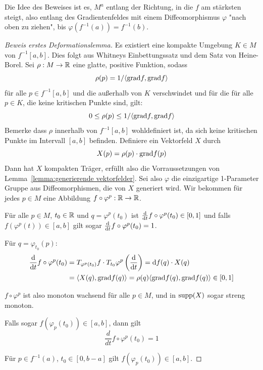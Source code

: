 Die Idee des Beweises ist es, $M^a$ entlang der Richtung, in die $f$ am stärksten
steigt, also entlang des Gradientenfeldes mit einem Diffeomorphismus $\varphi$ 
"nach oben zu ziehen", bis $\varphi(f^{-1}(a)) = f^{-1}(b)$.

\begin{proof}[Beweis erstes Deformationslemma]
    Es existiert eine kompakte Umgebung $K \in M$ von $f^{-1}[a, b]$. Dies folgt
    aus Whitneys Einbettungssatz und dem Satz von Heine-Borel.
    Sei $\rho: M \to { \mathbb R }$ eine glatte, positive Funktion, sodass
    \[ \rho(p) = 1 / \langle { \operatorname{grad} } f, { \operatorname{grad} } f \rangle \]
    für alle $p \in f^{-1}[a, b]$ und die außerhalb von $K$ verschwindet und für
    die für alle $p \in K$, die keine kritischen Punkte sind, gilt: 
    \[ 0 \leq \rho(p) \leq 1 / \langle { \operatorname{grad} } f, { \operatorname{grad} } f \rangle \]
    Bemerke dass $\rho$ innerhalb von $f^{-1}[a, b]$ wohldefiniert 
    ist, da sich keine kritischen Punkte im Intervall $[a, b]$ befinden. 
    Definiere ein Vektorfeld $X$ durch
    \[ X(p) = \rho(p) \cdot { \operatorname{grad} } f (p) \]
    Dann hat $X$ kompakten Träger, erfüllt also die Vorraussetzungen von 
    Lemma~\ref{lemma:generierende vektorfelder}. Sei also $\varphi$ die
    einzigartige 1-Parameter Gruppe aus Diffeomorphismen, die von $X$ generiert
    wird. 
    Wir bekommen für jedes $p \in M$ eine Abbildung $f \circ \varphi^p: { \mathbb R } \to { \mathbb R }$.
    
     Für alle $p \in M$, $t_0 \in { \mathbb R }$ und $q = \varphi^p(t_0)$
    ist ${ \frac{{ \operatorname{d} } }{{ \operatorname{d} } t} } f \circ \varphi^p (t_0) \in [0, 1]$ und falls $f(\varphi^p(t)) \in [a, b]$
    gilt sogar ${ \frac{{ \operatorname{d} } }{{ \operatorname{d} } t} } f \circ \varphi^p (t_0) = 1$.

    Für $q = \varphi_{t_0}(p)$:
    \begin{align*}
        { \frac{{ \operatorname{d} }}{{ \operatorname{d} }t} } f \circ \varphi^p (t_0)
        & = T_{\varphi^p(t_0)} f \cdot T_{t_0}\varphi^p \left( { \frac{{ \operatorname{d} } }{{ \operatorname{d} } t} } \right)
        = { \operatorname{d} } f (q) \cdot X(q) \\
        & = \langle X(q), { \operatorname{grad} } f (q) \rangle 
        = \rho(q) \langle { \operatorname{grad} } f (q), { \operatorname{grad} } f (q) \rangle \in [0, 1]
    \end{align*}
    
    $f \circ \varphi^p$ ist also monoton wachsend für alle $p \in M$, und in 
    ${ \operatorname{supp} } (X)$ sogar streng monoton.

    Falls sogar $f(\varphi_p(t_0)) \in [a, b]$, dann gilt
    \[ \frac{d}{dt} f \circ \varphi^p (t_0) = 1 \]
    \sectiondone

     Für $p \in f^{-1}(a)$, $t_0 \in [0, b-a]$ gilt $f(\varphi_p(t_0)) \in [a, b]$.
    

\end{proof}
